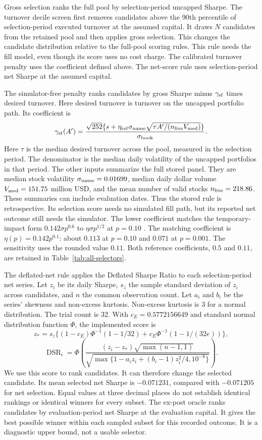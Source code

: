 \documentclass[10pt,letterpaper]{article}
\begin{document}
Gross selection ranks the full pool by selection-period uncapped Sharpe. The turnover decile screen first removes candidates above the 90th percentile of selection-period executed turnover at the assumed capital. It draws $N$ candidates from the retained pool and then applies gross selection. This changes the candidate distribution relative to the full-pool scoring rules. This rule needs the fill model, even though its score uses no cost charge. The calibrated turnover penalty uses the coefficient defined above. The net-score rule uses selection-period net Sharpe at the assumed capital.

The simulator-free penalty ranks candidates by gross Sharpe minus $\gamma_{\rm sf}$ times desired turnover. Here desired turnover is turnover on the uncapped portfolio path. Its coefficient is
\[
 \gamma_{\rm sf}(A')=
 \frac{\sqrt{252}\{s+\eta_{\rm ref}\sigma_{\rm name}
           \sqrt{\tau A'/(n_{\rm live}V_{\rm med})}\}}
      {\sigma_{\rm book}}.
\]
Here $\tau$ is the median desired turnover across the pool, measured in the selection period. The denominator is the median daily volatility of the uncapped portfolios in that period. The other inputs summarize the full stored panel. They are median stock volatility $\sigma_{\rm name}=0.01699$, median daily dollar volume $V_{\rm med}=151.75$ million USD, and the mean number of valid stocks $n_{\rm live}=218.86$. These summaries can include evaluation dates. Thus the stored rule is retrospective. Its selection score needs no simulated fill path, but its reported net outcome still needs the simulator. The lower coefficient matches the temporary-impact form $0.142\sigma p^{0.6}$ to $\eta\sigma p^{1/2}$ at $p=0.10$ \citep{almgren2005direct}. The matching coefficient is $\eta(p)=0.142p^{0.1}$: about $0.113$ at $p=0.10$ and $0.071$ at $p=0.001$. The sensitivity uses the rounded value $0.11$. Both reference coefficients, $0.5$ and $0.11$, are retained in Table~\ref{tab:all-selectors}.

The deflated-net rule applies the Deflated Sharpe Ratio \citep{bailey2014deflated} to each selection-period net series. Let $z_i$ be its daily Sharpe, $s_z$ the sample standard deviation of $z_i$ across candidates, and $n$ the common observation count. Let $a_i$ and $b_i$ be the series' skewness and non-excess kurtosis. Non-excess kurtosis is 3 for a normal distribution. The trial count is 32. With $c_E=0.5772156649$ and standard normal distribution function $\Phi$, the implemented score is
\[
 z_* = s_z\{(1-c_E)\Phi^{-1}(1-1/32)+c_E\Phi^{-1}(1-1/(32e))\},
\]
\[
 \operatorname{DSR}_i=\Phi\!\left(
 \frac{(z_i-z_*)\sqrt{\max(n-1,1)}}
 {\sqrt{\max\{1-a_i z_i+(b_i-1)z_i^2/4,10^{-8}\}}}\right).
\]
We use this score to rank candidates. It can therefore change the selected candidate. Its mean selected net Sharpe is $-0.071231$, compared with $-0.071205$ for net selection. Equal values at three decimal places do not establish identical rankings or identical winners for every subset. The ex-post oracle ranks candidates by evaluation-period net Sharpe at the evaluation capital. It gives the best possible winner within each sampled subset for this recorded outcome. It is a diagnostic upper bound, not a usable selector.
\end{document}
